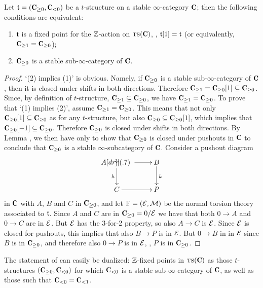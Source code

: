\documentclass[a4paper,12pt]{amsart}
\begin{document}
\begin{proposition}\label{stableare}
Let $\tee=(\C_{\geq 0},\C_{<0})$ be a $t$-structure on a stable $\infty$-category $\C$; then the following conditions are equivalent:
\begin{enumerate}
\item $\mathfrak{t}$ is a fixed point for the $\mathbb{Z} $-action on $\ts(\C)$, \ie, $\mathfrak{t}[1]=\mathfrak{t}$ (or equivalently, $\C_{\geq 1}= \C_{\geq 0}$);
\item $\C_{\geq 0}$ is a stable sub-$\infty$-category of $\C$.
\end{enumerate}
\end{proposition}
\begin{proof}
`(2) implies (1)' is obvious. Namely, if  $\C_{\ge 0}$ is a stable sub-$\infty$-category of $\C$, then it is closed under shifts in both directions. Therefore $\C_{\ge 1}=\C_{\geq 0}[1]\subseteq \C_{\ge 0}$. Since, by definition of $t$-structure, $\C_{\geq 1}\subseteq \C_{\geq 0}$, we have $\C_{\geq 1}= \C_{\geq 0}$. To prove that `(1) implies (2)', assume $\C_{\geq 1}=\C_{\geq 0}$. This means that not only $\C_{\geq 0}[1]\subseteq \C_{\geq 0}$ as for any $t$-structure, but also $\C_{\geq 0}\subseteq \C_{\geq 0}[1]$, which implies that $\C_{\geq 0}[-1]\subseteq \C_{\geq 0}$. Therefore $\C_{\geq 0}$ is closed under shifts in both directions. By Lemma ,  we then have only to show that $\C_{\geq 0}$ is closed under pushouts in $\C$ to conclude that $\C_{\geq 0}$ is a stable $\infty$-subcategory of $\C$. Consider a pushout diagram
\[
\xymatrix{
 A \ar[r]\ar[d]_h \po & B\ar[d]^k \\
 C \ar[r] & P
}
\]
in $\C$ with $A$, $B$ and $C$ in $\C_{\geq 0}$, and let $\mathbb{F}=(\mathcal{E},\mathcal{M})$ be the normal torsion theory associated to $\mathfrak{t}$. Since $A$ and $C$ are in $\C_{\geq 0} = 0/\E$ we have that both $0\to A$ and $0\to C$ are in $\mathcal{E}$. But $\mathcal{E}$ has the 3-for-2 property, so also $A\to C$ is $\mathcal{E}$. Since $\mathcal{E}$ is closed for pushouts, this implies that also $B\to P$ is in $\mathcal{E}$. But $0\to B$ in in $\mathcal{E}$ since $B$ is in $\C_{\geq 0}$, and therefore also $0\to P$ is in $\mathcal{E}$, \ie, $P$ is in $\C_{\geq 0}$.
\end{proof}
\begin{remark}\label{dual.of.the.above}
The statement of \aprop {} can easily be dualized: $\mathbb{Z} $-fixed points in $\ts(\C)$ as those $t$-structures $(\C_{\geq 0},\C_{<0})$ for which $\C_{<0}$ is a stable sub-$\infty$-category of $\C$, as well as those such that $\C_{<0} = \C_{<1}$.
\end{remark}
\end{document}

